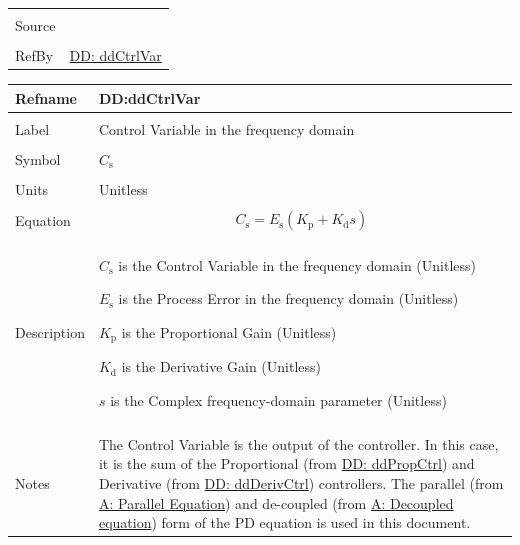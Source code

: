 \documentclass[12pt]{article}
\begin{document}
\begin{minipage}{\textwidth}
\begin{tabular}{>{\raggedright}p{}>{\raggedright\arraybackslash}p{}}
\\ \midrule \\
Source & \cite{johnson2008}
         
\\ \midrule \\
RefBy & \hyperref[DD:ddCtrlVar]{DD: ddCtrlVar}
        
\\ \bottomrule
\end{tabular}
\end{minipage}

\vspace{\baselineskip}
\noindent
\begin{minipage}{\textwidth}
\begin{tabular}{>{\raggedright}p{}>{\raggedright\arraybackslash}p{}}
\toprule \textbf{Refname} & \textbf{DD:ddCtrlVar}
\label{DD:ddCtrlVar}
\\ \midrule \\
Label & Control Variable in the frequency domain
        
\\ \midrule \\
Symbol & ${C_{\text{s}}}$
         
\\ \midrule \\
Units & Unitless
        
\\ \midrule \\
Equation & \begin{displaymath}
           {C_{\text{s}}}={E_{\text{s}}} \left({K_{\text{p}}}+{K_{\text{d}}} s\right)
           \end{displaymath}
\\ \midrule \\
Description & \begin{symbDescription}
              \item{${C_{\text{s}}}$ is the Control Variable in the frequency domain (Unitless)}
              \item{${E_{\text{s}}}$ is the Process Error in the frequency domain (Unitless)}
              \item{${K_{\text{p}}}$ is the Proportional Gain (Unitless)}
              \item{${K_{\text{d}}}$ is the Derivative Gain (Unitless)}
              \item{$s$ is the Complex frequency-domain parameter (Unitless)}
              \end{symbDescription}
\\ \midrule \\
Notes & The Control Variable is the output of the controller. In this case, it is the sum of the Proportional (from \hyperref[DD:ddPropCtrl]{DD: ddPropCtrl}) and Derivative (from \hyperref[DD:ddDerivCtrl]{DD: ddDerivCtrl}) controllers. The parallel (from \hyperref[parallelEq]{A: Parallel Equation}) and de-coupled (from \hyperref[decoupled]{A: Decoupled equation}) form of the PD equation is used in this document.
        

\end{tabular}
\end{minipage}
\end{document}
